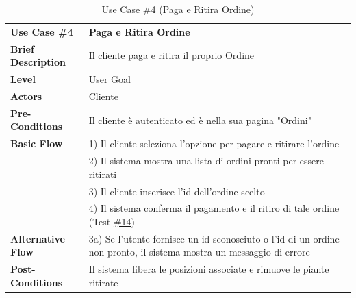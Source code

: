 \documentclass{article}
\begin{document}
    
    \begin{table}[p]
        \begin{tabularx}{\textwidth}{ | l  X | }
            \rowcolor{lightgray!70}
            \hline
            \textbf{Use Case \#4} & \textbf{Paga e Ritira Ordine }\\[0.5ex]
            \textbf{Brief Description} & Il cliente paga e ritira il proprio Ordine\\
            \rowcolor{blue!10}
            \textbf{Level} & User Goal \\
            \textbf{Actors} & Cliente \\
            \rowcolor{blue!10}
            \textbf{Pre-Conditions} & Il cliente è autenticato ed è nella sua pagina "Ordini" \\
            \textbf{Basic Flow} & 1) Il cliente seleziona l'opzione per pagare e ritirare l'ordine\\
            & 2) Il sistema mostra una lista di ordini pronti per essere ritirati\\
            & 3) Il cliente inserisce l'id dell'ordine scelto\\
            & 4) Il sistema conferma il pagamento e il ritiro di tale ordine (Test \hyperref[test_14]{\#14})\\
            \rowcolor{blue!10}
            \textbf{Alternative Flow} & 3a) Se l'utente fornisce un id sconosciuto o l'id di un ordine non pronto, il sistema mostra un messaggio di errore\\
            \textbf{Post-Conditions} & Il sistema libera le posizioni associate e rimuove le piante ritirate \\
            \hline
        \end{tabularx}
        \label{use_case_4}
        \caption{Use Case \#4 (Paga e Ritira Ordine)}
    \end{table}
    
\end{document}
